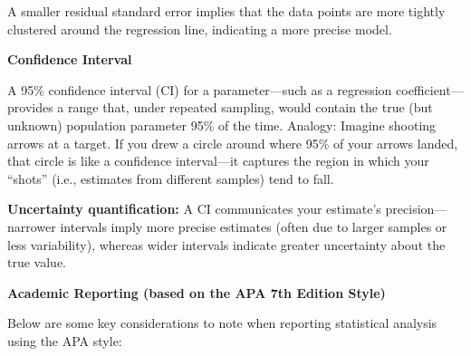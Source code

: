 \documentclass[
]{article}
\begin{document}
A smaller residual standard error implies that the data points are more
tightly clustered around the regression line, indicating a more precise
model.

\textbf{Confidence Interval}

A 95\% confidence interval (CI) for a parameter---such as a regression
coefficient---provides a range that, under repeated sampling, would
contain the true (but unknown) population parameter 95\% of the time.
Analogy: Imagine shooting arrows at a target. If you drew a circle
around where 95\% of your arrows landed, that circle is like a
confidence interval---it captures the region in which your ``shots''
(i.e., estimates from different samples) tend to fall.

\textbf{Uncertainty quantification:} A CI communicates your estimate's
precision---narrower intervals imply more precise estimates (often due
to larger samples or less variability), whereas wider intervals indicate
greater uncertainty about the true value.

\textbf{Academic Reporting (based on the APA 7th Edition Style)}

Below are some key considerations to note when reporting statistical
analysis using the APA style:\\
\end{document}
